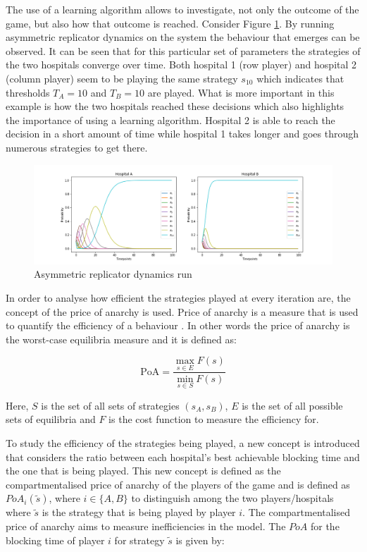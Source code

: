 The use of a learning algorithm allows to investigate, not only the outcome of 
the game, but also how that outcome is reached.
Consider Figure \ref{fig:ard_by_itself}. 
By running asymmetric replicator dynamics on the system the behaviour that 
emerges can be observed.
It can be seen that for this particular set of parameters the strategies of 
the two hospitals converge over time. 
Both hospital 1 (row player) and hospital 2 (column player) seem to be playing 
the same strategy \(s_{10}\) which indicates that thresholds \(T_A = 10\) and 
\(T_B = 10\) are played.
What is more important in this example is how the two hospitals reached these
decisions which also highlights the importance of using a learning algorithm.
Hospital 2 is able to reach the decision in a short amount of time while 
hospital 1 takes longer and goes through numerous strategies to get there.

\begin{figure}[H]
    \centering
    \includegraphics[scale=0.4, trim=120 0 120 0]{imgs/asymmetric_rd/asymmetric_rd.png}
    \caption{Asymmetric replicator dynamics run}
    \label{fig:ard_by_itself}
\end{figure}

In order to analyse how efficient the strategies played at every iteration are, 
the concept of the price of anarchy is used.
Price of anarchy is a measure that is used to quantify the efficiency of a
behaviour \cite{roughgarden2005selfish}.
In other words the price of anarchy is the worst-case equilibria measure and it 
is defined as:

\begin{equation}\label{eq:general_price_of_anarchy}
    \text{PoA} = \frac{\max_{s \in E} F(s)}{\min_{s \in S} F(s)}
\end{equation}

Here, \(S\) is the set of all sets of strategies \((s_A, s_B)\), \(E\) is the 
set of all possible sets of equilibria and \(F\) is the cost function to 
measure the efficiency for. 

To study the efficiency of the strategies being played, a new concept is 
introduced that considers the ratio between each hospital's best achievable 
blocking time and the one that is being played.
This new concept is defined as the compartmentalised price of anarchy of the 
players of the game and is defined as \(PoA_i(\tilde{s})\), where 
\(i \in \{A, B\}\) to distinguish among the two players/hospitals where 
\(\tilde{s}\) is the strategy that is being played by player \( i \). 
The compartmentalised price of anarchy aims to measure inefficiencies in the 
model.
The \(PoA\) for the blocking time of player \(i\) for strategy \(\tilde{s}\) 
is given by:

